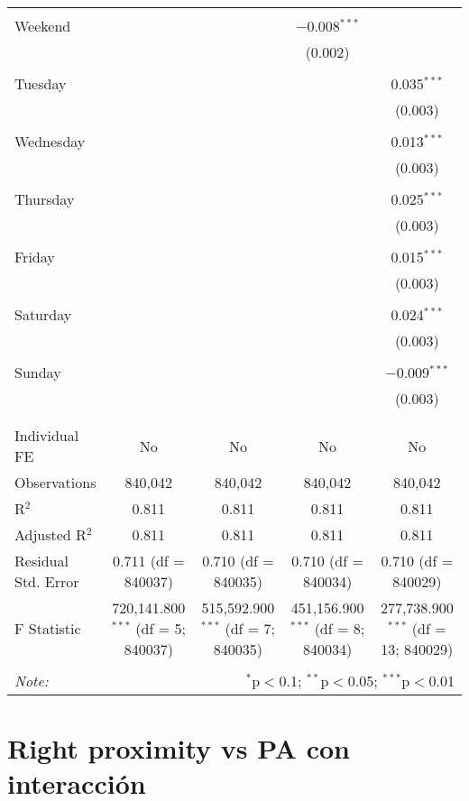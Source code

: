 \documentclass[
]{article}
\begin{document}
\begin{table}[!htbp]
{\begin{tabular}{@{\extracolsep{5pt}}lcccc}
  & & & & \\ 
 Weekend &  &  & $-$0.008$^{***}$ &  \\ 
  &  &  & (0.002) &  \\ 
  & & & & \\ 
 Tuesday &  &  &  & 0.035$^{***}$ \\ 
  &  &  &  & (0.003) \\ 
  & & & & \\ 
 Wednesday &  &  &  & 0.013$^{***}$ \\ 
  &  &  &  & (0.003) \\ 
  & & & & \\ 
 Thursday &  &  &  & 0.025$^{***}$ \\ 
  &  &  &  & (0.003) \\ 
  & & & & \\ 
 Friday &  &  &  & 0.015$^{***}$ \\ 
  &  &  &  & (0.003) \\ 
  & & & & \\ 
 Saturday &  &  &  & 0.024$^{***}$ \\ 
  &  &  &  & (0.003) \\ 
  & & & & \\ 
 Sunday &  &  &  & $-$0.009$^{***}$ \\ 
  &  &  &  & (0.003) \\ 
  & & & & \\ 
\hline \\[-1.8ex] 
Individual FE & No & No & No & No \\ 
Observations & 840,042 & 840,042 & 840,042 & 840,042 \\ 
R$^{2}$ & 0.811 & 0.811 & 0.811 & 0.811 \\ 
Adjusted R$^{2}$ & 0.811 & 0.811 & 0.811 & 0.811 \\ 
Residual Std. Error & 0.711 (df = 840037) & 0.710 (df = 840035) & 0.710 (df = 840034) & 0.710 (df = 840029) \\ 
F Statistic & 720,141.800$^{***}$ (df = 5; 840037) & 515,592.900$^{***}$ (df = 7; 840035) & 451,156.900$^{***}$ (df = 8; 840034) & 277,738.900$^{***}$ (df = 13; 840029) \\ 
\hline 
\hline \\[-1.8ex] 
\textit{Note:}  & \multicolumn{4}{r}{$^{*}$p$<$0.1; $^{**}$p$<$0.05; $^{***}$p$<$0.01} \\ 
\end{tabular}
} 
\end{table} 
\newpage
\section{Right proximity vs PA con interacción}
\end{document}

